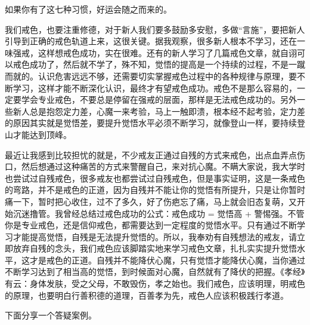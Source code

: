 \documentclass{ctexart}
\begin{document}
如果你有了这七种习惯，好运会随之而来的。

我们戒色，也要注重修德，对于新人我们要多鼓励多安慰，多做“言施”，要把新人引导到正确的戒色轨道上来，这很关键。据我观察，很多新人根本不学习，还在一味强戒，这样想戒色成功，实在很难。还有的新人学习了几篇戒色文章，就自诩可以戒色成功了，然后就不学了，殊不知，觉悟的提高是一个持续的过程，不是一蹴而就的。认识危害远远不够，还需要切实掌握戒色过程中的各种规律与原理，要不断学习，这样才能不断深化认识，最终才有望戒色成功。戒色不是那么容易的，一定要学会专业戒色，不要总是停留在强戒的层面，那样是无法戒色成功的。另外一些新人总是抱怨定力差，心魔一来考验，马上一触即溃，根本经不起考验，定力差的原因其实就是觉悟差，要提升觉悟水平必须不断学习，就像登山一样，要持续登山才能达到顶峰。

最近让我感到比较担忧的就是，不少戒友正通过自残的方式来戒色，出点血弄点伤口，然后想通过这种痛苦的方式来警醒自己，来对抗心魔。不瞒大家说，我大学时也尝试过自残戒色，很多戒友也都尝试过自残戒色，但是事实证明，这是一条戒色的弯路，并不是戒色的正道，因为自残并不能让你的觉悟有所提升，只是让你暂时痛一下，暂时把心收住，过不了多久，好了伤疤忘了痛，马上就会旧态复萌，又开始沉迷撸管。我曾经总结过戒色成功的公式：戒色成功 = 觉悟高 + 警惕强。不管你是专业戒色，还是信仰戒色，都需要达到一定程度的觉悟水平。只有通过不断学习才能提高觉悟，自残是无法提升觉悟的。所以，我奉劝有自残想法的戒友，请立即放弃自残的念头，我们戒色应该脚踏实地来学习戒色文章，扎扎实实提升觉悟水平，这才是戒色的正道。自残并不能降伏心魔，只有觉悟才能降伏心魔，当你通过不断学习达到了相当高的觉悟，到时候面对心魔，自然就有了降伏的把握。《孝经》有云：身体发肤，受之父母，不敢毁伤，孝之始也。我们戒色，应该明理，明戒色的原理，也要明白行善积德的道理，百善孝为先，戒色人应该积极践行孝道。

下面分享一个答疑案例。
\end{document}
